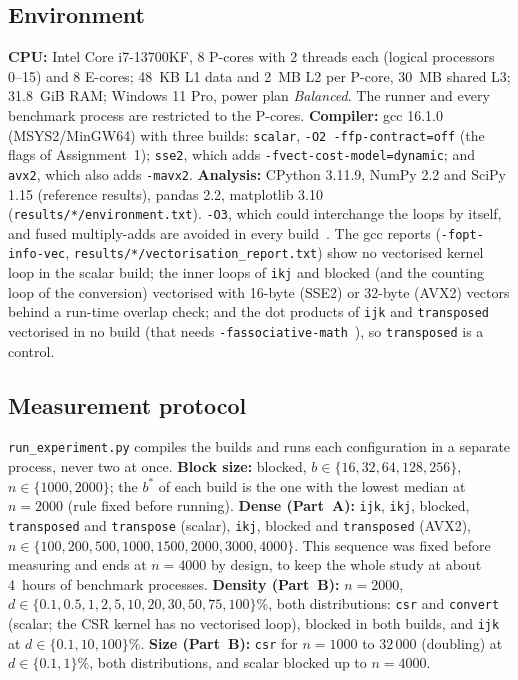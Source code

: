 \documentclass[11pt,a4paper]{article}
\begin{document}
\subsection{Environment}

\textbf{CPU:} Intel Core i7-13700KF, 8 P-cores with 2 threads each (logical processors
0--15) and 8 E-cores; 48~KB L1 data and 2~MB L2 per P-core, 30~MB shared L3; 31.8~GiB RAM;
Windows 11 Pro, power plan \textit{Balanced}. The runner and every benchmark process are
restricted to the P-cores. \textbf{Compiler:} gcc 16.1.0 (MSYS2/MinGW64) with three builds:
\texttt{scalar}, \texttt{-O2 -ffp-contract=off} (the flags of Assignment~1); \texttt{sse2},
which adds \texttt{-fvect-cost-model=dynamic}; and \texttt{avx2}, which also adds
\texttt{-mavx2}. \textbf{Analysis:} CPython 3.11.9, NumPy 2.2 and SciPy 1.15 (reference
results), pandas 2.2, matplotlib 3.10 (\texttt{results/*/environment.txt}). \texttt{-O3},
which could interchange the loops by itself, and fused multiply-adds are avoided in every
build~\cite{gccopt}. The gcc reports (\texttt{-fopt-info-vec},
\texttt{results/*/vectorisation\_report.txt}) show no vectorised kernel loop in the scalar
build; the inner loops of \texttt{ikj} and blocked (and the counting loop of the conversion)
vectorised with 16-byte (SSE2) or 32-byte (AVX2) vectors behind a run-time overlap check;
and the dot products of \texttt{ijk} and \texttt{transposed} vectorised in no build (that
needs \texttt{-fassociative-math}~\cite{gccopt}), so \texttt{transposed} is a control.

\subsection{Measurement protocol}

\texttt{run\_experiment.py} compiles the builds and runs each configuration in a separate
process, never two at once. \textbf{Block size:} blocked, $b \in \{16, 32, 64, 128, 256\}$,
$n \in \{1000, 2000\}$; the $b^*$ of each build is the one with the lowest median at
$n = 2000$ (rule fixed before running). \textbf{Dense (Part~A):} \texttt{ijk}, \texttt{ikj},
blocked, \texttt{transposed} and \texttt{transpose} (scalar), \texttt{ikj}, blocked and
\texttt{transposed} (AVX2), $n \in \{100, 200, 500, 1000, 1500, 2000, 3000, 4000\}$. This
sequence was fixed before measuring and ends at $n = 4000$ by design, to keep the whole
study at about 4~hours of benchmark processes. \textbf{Density (Part~B):} $n = 2000$,
$d \in \{0.1, 0.5, 1, 2, 5, 10, 20, 30, 50, 75, 100\}\%$, both distributions: \texttt{csr}
and \texttt{convert} (scalar; the CSR kernel has no vectorised loop), blocked in both builds,
and \texttt{ijk} at $d \in \{0.1, 10, 100\}\%$. \textbf{Size (Part~B):} \texttt{csr} for
$n = 1000$ to $32\,000$ (doubling) at $d \in \{0.1, 1\}\%$, both distributions, and scalar
blocked up to $n = 4000$.
\end{document}
